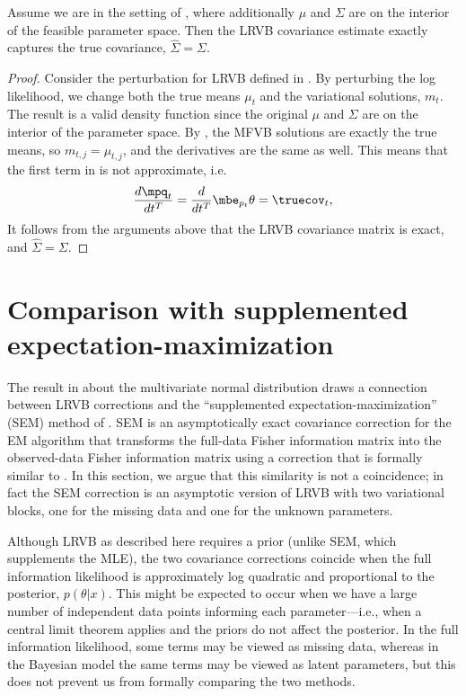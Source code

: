 \begin{proposition} \label{prop:lrvb_mvn}
  Assume we are in the setting of , where additionally
  $\mu$ and $\Sigma$ are on the interior of the feasible parameter space.
  Then the LRVB covariance estimate exactly captures the true covariance,
  $\hat{\Sigma} = \Sigma$.

\end{proposition}

\begin{proof}

  Consider the perturbation for LRVB defined in .
  By perturbing the log likelihood, we change both the true means $\mu_t$
  and the variational solutions, $m_t$. The result is a valid
  density function since the original $\mu$ and $\Sigma$ are on the
  interior of the parameter space.
  By , the MFVB solutions are exactly the true
  means, so $m_{t,j} = \mu_{t,j}$, and the derivatives are the same
  as well.  This means that the first term in  is
  not approximate, i.e.
%
  \begin{equation*}
  \frac{d \mpq_{t}}{d t^{T}}
    = \frac{d}{d t^{T}} \mbe_{p_{t}} \theta
    = \truecov_{t},
  \end{equation*}
%
  It follows from the arguments above that the LRVB covariance
  matrix is exact, and $\hat{\Sigma} = \Sigma$.

\end{proof}


\section{Comparison with supplemented expectation-maximization}\label{app:SEM}

The result in  about the multivariate normal distribution
draws a connection between LRVB
corrections and the ``supplemented expectation-maximization'' (SEM)
method of \cite{meng:1991:using}.  SEM is an asymptotically
exact covariance correction for the EM algorithm that transforms
the full-data Fisher information matrix into the observed-data Fisher
information matrix using a correction that is formally similar to
.  In this section, we argue that this similarity
is not a coincidence; in fact the SEM correction is an
asymptotic version of LRVB with two variational blocks,
one for the missing data and one for the unknown parameters.

Although LRVB as described here requires a prior
(unlike SEM, which supplements the MLE),
the two covariance corrections coincide when
the full information likelihood is approximately log quadratic
and proportional to the posterior, $p(\theta \vert x)$.
This might be expected to occur when we have a large number
of independent data points informing each parameter---i.e.,
when a central limit theorem applies and the priors do not
affect the posterior.
In the full information likelihood, some
terms may be viewed as missing data, whereas in the Bayesian
model the same terms may be viewed as latent parameters,
but this does not prevent us from formally comparing the two methods.

